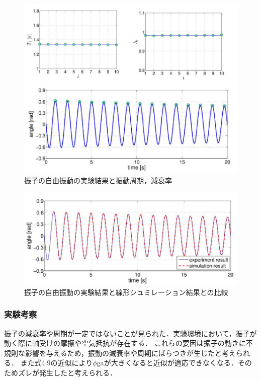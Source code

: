 \newpage

\begin{figure}[h]
  \centering
  \includegraphics[scale=0.7]{sozai/8.pdf}
  \caption{振子の自由振動の実験結果と振動周期，減衰率}
\end{figure}

\begin{figure}[h]
  \centering
  \includegraphics[scale=0.7]{sozai/9.pdf}
  \caption{振子の自由振動の実験結果と線形シュミレーション結果との比較}
\end{figure}

\subsubsection{実験考察}
振子の減衰率や周期が一定ではないことが見られた．実験環境において，振子が動く際に軸受けの摩擦や空気抵抗が存在する．
これらの要因は振子の動きに不規則な影響を与えるため，振動の減衰率や周期にばらつきが生じたと考えられる．
また式4.9の近似により\( \phi \)gaが大きくなると近似が適応できなくなる．そのためズレが発生したと考えられる．


